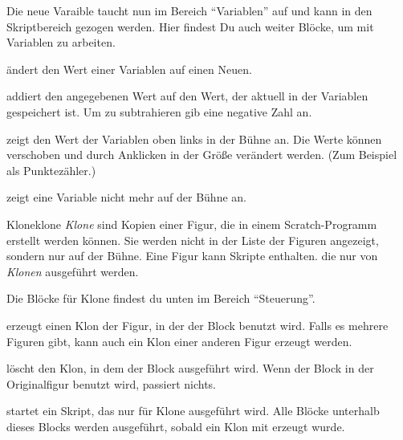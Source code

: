 \documentclass[lerntheke,12pt,a5paper,landscape]{arbeitsblatt}
\begin{document}
\begin{loesungskarte}[Variablen]
	Die neue Varaible taucht nun im Bereich \enquote{Variablen} auf und kann in den Skriptbereich gezogen werden. Hier findest Du auch weiter Blöcke, um mit Variablen zu arbeiten.

	 ändert den Wert einer Variablen auf einen Neuen.

	 addiert den angegebenen Wert auf den Wert, der aktuell in der Variablen gespeichert ist. Um zu subtrahieren gib eine negative Zahl an.

	 zeigt den Wert der Variablen oben links in der Bühne an. Die Werte können verschoben und durch Anklicken in der Größe verändert werden. (Zum Beispiel als Punktezähler.)

	 zeigt eine Variable nicht mehr auf der Bühne an.
\end{loesungskarte}

\begin{hilfekarte}{Klone}{klone}
	\emph{Klone} sind Kopien einer Figur, die in einem Scratch-Programm erstellt werden können. Sie werden nicht in der Liste der Figuren angezeigt, sondern nur auf der Bühne. Eine Figur kann Skripte enthalten. die nur von \emph{Klonen} ausgeführt werden.

	Die Blöcke für Klone findest du unten im Bereich \enquote{Steuerung}.

	 erzeugt einen Klon der Figur, in der der Block benutzt wird. Falls es mehrere Figuren gibt, kann auch ein Klon einer anderen Figur erzeugt werden.

	 löscht den Klon, in dem der Block ausgeführt wird. Wenn der Block in der Originalfigur benutzt wird, passiert nichts.

	 startet ein Skript, das nur für Klone ausgeführt wird. Alle Blöcke unterhalb dieses Blocks werden ausgeführt, sobald ein Klon mit  erzeugt wurde.
\end{hilfekarte}
\end{document}
